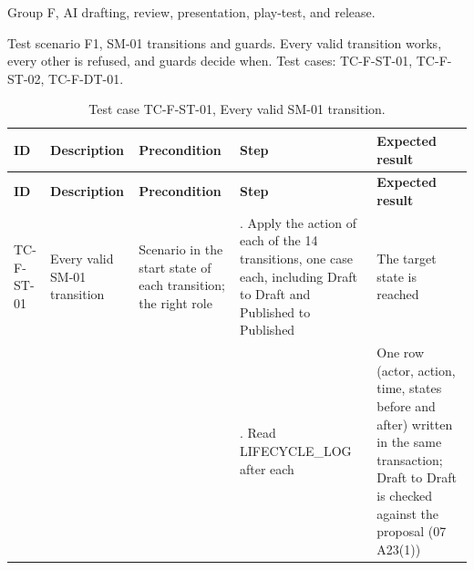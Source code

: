 Group F, AI drafting, review, presentation, play-test, and release.

Test scenario F1, SM-01 transitions and guards. Every valid transition works, every other is refused, and guards decide when. Test cases: TC-F-ST-01, TC-F-ST-02, TC-F-DT-01.

{\small
\begin{longtable}{|>{\raggedright\arraybackslash}p{}|>{\raggedright\arraybackslash}p{}|>{\raggedright\arraybackslash}p{}|>{\raggedright\arraybackslash}p{}|>{\raggedright\arraybackslash}p{}|}
\caption{Test case TC-F-ST-01, Every valid SM-01 transition.} \\
\hline
\textbf{ID} & \textbf{Description} & \textbf{Precondition} & \textbf{Step} & \textbf{Expected result} \\ \hline
\endfirsthead
\hline
\textbf{ID} & \textbf{Description} & \textbf{Precondition} & \textbf{Step} & \textbf{Expected result} \\ \hline
\endhead
TC-F-ST-01 & Every valid SM-01 transition & Scenario in the start state of each transition; the right role & 1. Apply the action of each of the 14 transitions, one case each, including Draft to Draft and Published to Published & The target state is reached \\ \hline
 &  &  & 2. Read LIFECYCLE\_LOG after each & One row (actor, action, time, states before and after) written in the same transaction; Draft to Draft is checked against the proposal (07 A23(1)) \\ \hline
\end{longtable}
}

